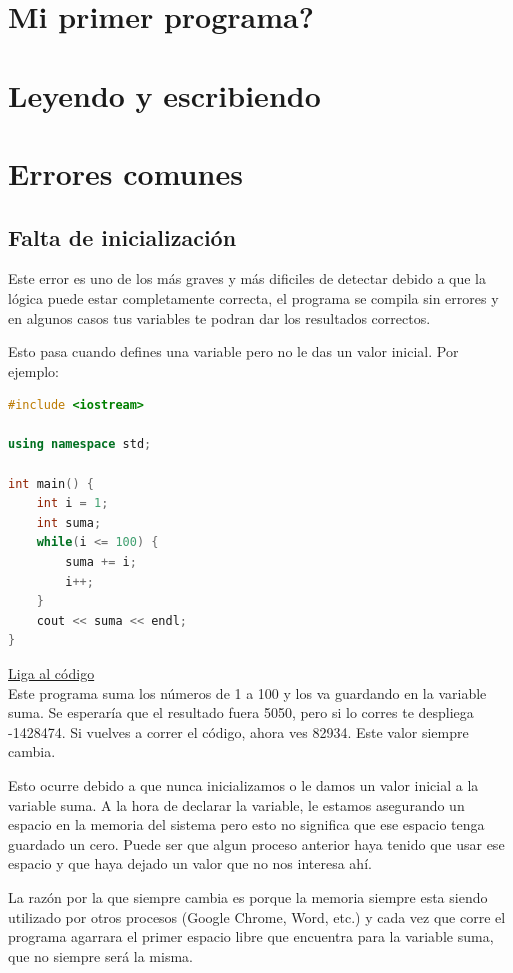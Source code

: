 \documentclass{article}
\begin{document}
\section{Mi primer programa?}

\section{Leyendo y escribiendo}

\section{Errores comunes}

\subsection{Falta de inicialización}
Este error es uno de los más graves y más dificiles de detectar debido a que la lógica puede estar completamente correcta, el programa se compila sin errores y en algunos casos tus variables te podran dar los resultados correctos.

Esto pasa cuando defines una variable pero no le das un valor inicial. Por ejemplo:

\begin{lstlisting}[language=C++, caption=Error de inicialización]
#include <iostream>

using namespace std;

int main() {
    int i = 1;
    int suma;
    while(i <= 100) {
        suma += i;
        i++;
    }
    cout << suma << endl;
}
\end{lstlisting}
\href{https://repl.it/@Jamesscn/Suma-Imposible}{Liga al código}\\

Este programa suma los números de 1 a 100 y los va guardando en la variable suma. Se esperaría que el resultado fuera 5050, pero si lo corres te despliega -1428474. Si vuelves a correr el código, ahora ves 82934. Este valor siempre cambia.

Esto ocurre debido a que nunca inicializamos o le damos un valor inicial a la variable suma. A la hora de declarar la variable, le estamos asegurando un espacio en la memoria del sistema pero esto no significa que ese espacio tenga guardado un cero. Puede ser que algun proceso anterior haya tenido que usar ese espacio y que haya dejado un valor que no nos interesa ahí.

La razón por la que siempre cambia es porque la memoria siempre esta siendo utilizado por otros procesos (Google Chrome, Word, etc.) y cada vez que corre el programa agarrara el primer espacio libre que encuentra para la variable suma, que no siempre será la misma.
\end{document}
